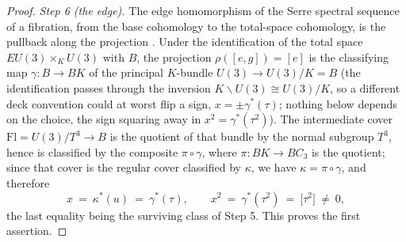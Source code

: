 \documentclass[11pt,a4paper]{article}
\begin{document}
\begin{proof}
\emph{Step 6 (the edge).} The edge homomorphism of the Serre spectral
sequence of a fibration, from the base cohomology to the total-space
cohomology, is the pullback along the projection
\cite{Brown1982,HatcherSS}. Under the identification of the total space
$EU(3)\times_KU(3)$ with $B$, the projection $\rho([e,g])=[e]$ is the
classifying map $\gamma\colon B\to BK$ of the principal $K$-bundle
$U(3)\to U(3)/K=B$ (the identification passes through the inversion
$K\backslash U(3)\cong U(3)/K$, so a different deck convention could at
worst flip a sign, $x=\pm\gamma^*(\tau)$; nothing below depends on the
choice, the sign squaring away in $x^2=\gamma^*(\tau^2)$). The intermediate
cover $\mathrm{Fl}=U(3)/T^3\to B$ is
the quotient of that bundle by the normal subgroup $T^3$, hence is
classified by the composite $\pi\circ\gamma$, where $\pi\colon BK\to BC_3$
is the quotient; since that cover is the regular cover classified by
$\kappa$, we have $\kappa=\pi\circ\gamma$, and therefore
\[
x\ =\ \kappa^*(u)\ =\ \gamma^*(\tau),
\qquad
x^2\ =\ \gamma^*(\tau^2)\ =\ \bigl[\tau^2\bigr]\ \ne\ 0,
\]
the last equality being the surviving class of Step 5. This proves the first
assertion.


\end{proof}
\end{document}
